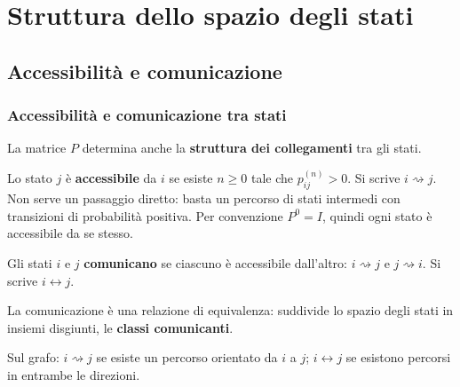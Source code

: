 

\section{Struttura dello spazio degli stati}

\subsection{Accessibilit\`{a} e comunicazione}%

\begin{frame}%
%

\frametitle{Accessibilit\`{a} e comunicazione tra stati}%
%

%


La matrice $P$ determina anche la \textbf{struttura dei collegamenti} tra gli stati.

\medskip

\begin{stepitemize}
\item Lo stato $j$ \`{e} \textbf{accessibile} da $i$ se esiste $n\geq0$ tale
che $p_{ij}^{(n)}>0$. Si scrive $i\rightsquigarrow j$. Non serve un passaggio
diretto: basta un percorso di stati intermedi con transizioni di
probabilit\`{a} positiva. Per convenzione $P^{0}=I$, quindi ogni stato \`{e}
accessibile da se stesso.

\item Gli stati $i$ e $j$ \textbf{comunicano} se ciascuno \`{e} accessibile
dall'altro: $i\rightsquigarrow j$ e $j\rightsquigarrow i$. Si scrive
$i\leftrightarrow j$.

\item La comunicazione \`{e} una relazione di equivalenza: suddivide lo spazio
degli stati in insiemi disgiunti, le \textbf{classi comunicanti}.
\end{stepitemize}

\medskip

\begin{center}
{\small Sul grafo: $i\rightsquigarrow j$ se esiste un percorso orientato da
$i$ a $j$; $i\leftrightarrow j$ se esistono percorsi in entrambe le
direzioni.}
\end{center}

%

\transboxout
\end{frame}%


